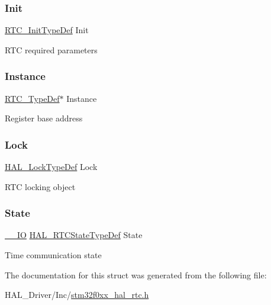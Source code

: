 \subsubsection{\texorpdfstring{Init}{Init}}
{\footnotesize\ttfamily \hyperlink{struct_r_t_c___init_type_def}{R\+T\+C\+\_\+\+Init\+Type\+Def} Init}

R\+TC required parameters \mbox{\label{struct_r_t_c___handle_type_def_acfce044f819f685610d976ca4f57054c}} 
\subsubsection{\texorpdfstring{Instance}{Instance}}
{\footnotesize\ttfamily \hyperlink{struct_r_t_c___type_def}{R\+T\+C\+\_\+\+Type\+Def}$\ast$ Instance}

Register base address \mbox{\label{struct_r_t_c___handle_type_def_ad4cf225029dbefe8d3fe660c33b8bb6b}} 
\subsubsection{\texorpdfstring{Lock}{Lock}}
{\footnotesize\ttfamily \hyperlink{stm32f0xx__hal__def_8h_ab367482e943333a1299294eadaad284b}{H\+A\+L\+\_\+\+Lock\+Type\+Def} Lock}

R\+TC locking object \mbox{\label{struct_r_t_c___handle_type_def_a5ac1164f6e004d661885edbd813c24b0}} 
\subsubsection{\texorpdfstring{State}{State}}
{\footnotesize\ttfamily \hyperlink{core__sc300_8h_aec43007d9998a0a0e01faede4133d6be}{\+\_\+\+\_\+\+IO} \hyperlink{group___r_t_c___exported___types_ga1e2460a2d13c4efc7a2a1ab2a1ebd32b}{H\+A\+L\+\_\+\+R\+T\+C\+State\+Type\+Def} State}

Time communication state 

The documentation for this struct was generated from the following file\+:\begin{DoxyCompactItemize}
\item 
H\+A\+L\+\_\+\+Driver/\+Inc/\hyperlink{stm32f0xx__hal__rtc_8h}{stm32f0xx\+\_\+hal\+\_\+rtc.\+h}\end{DoxyCompactItemize}
